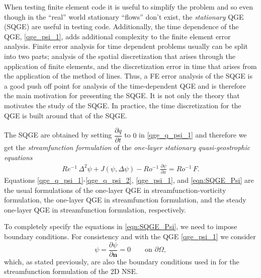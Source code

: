 When testing finite element code it is useful to simplify the problem and so
even though in the ``real'' world stationary ``flows'' don't exist, the
\emph{stationary} QGE (SQGE) are useful in testing code.  Additionally, the time
dependence of the QGE, \eqref{qge_psi_1}, adds additional complexity to the
finite element error analysis. Finite error analysis for time dependent problems
usually can be split into two parts; analysis of the spatial discretization that
arises through the application of finite elements, and the discretization error
in time that arises from the application of the method of lines. Thus, a FE
error analysis of the SQGE is a good push off point for analysis of the
time-dependent QGE and is therefore the main motivation for presenting the SQGE.
It is not only the theory that motivates the study of the SQGE. In practice, the
time discretization for the QGE is built around that of the SQGE.

The SQGE are obtained by setting $\dfrac{\partial q}{\partial t}$ to $0$ in
\eqref{qge_q_psi_1} and therefore we get the \emph{streamfunction formulation}
of the \emph{one-layer stationary quasi-geostrophic equations}
\begin{eqnarray}
  Re^{-1} \, \Delta^2 \psi + J(\psi , \Delta \psi) - Ro^{-1} \, \frac{\partial
    \psi}{\partial x} = Ro^{-1} \, F .
  \label{eqn:SQGE_Psi}
\end{eqnarray}
Equations \eqref{qge_q_psi_1}-\eqref{qge_q_psi_2}, \eqref{qge_psi_1}, and
\eqref{eqn:SQGE_Psi} are the usual formulations of the one-layer QGE in
streamfunction-vorticity formulation, the one-layer QGE in streamfunction
formulation, and the steady one-layer QGE in streamfunction formulation,
respectively.

To completely specify the equations in \eqref{eqn:SQGE_Psi}, we need to impose
boundary conditions. For consistency and with the QGE \eqref{qge_psi_1}  we
consider
\begin{equation*}
  \psi = \frac{\partial \psi}{\partial \mathbf{n}} = 0 \qquad \text{on } \partial \Omega,
\end{equation*}
which, as stated previously, are also the boundary conditions used in
\cite{Gunzburger89} for the streamfunction formulation of the 2D NSE.

